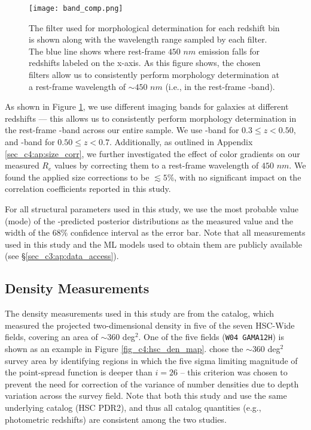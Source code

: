 \begin{figure}[htb]
    \centering
    \texttt{[image: band\_comp.png]}
    \caption{The filter used for morphological determination for each redshift bin is shown along with the wavelength range sampled by each filter. The blue line shows where rest-frame $450\,\,nm$ emission falls for redshifts labeled on the x-axis. As this figure shows, the chosen filters allow us to consistently perform morphology determination at a rest-frame wavelength of $\sim450\,\,nm$ (i.e., in the rest-frame \gb{}-band).}
    \label{fig_c4:band_comp}
\end{figure}

As shown in Figure \ref{fig_c4:band_comp}, we use different imaging bands for galaxies at different redshifts --- this allows us to consistently perform morphology determination in the rest-frame \gb-band across our entire sample. We use \rb-band for $0.3 \leq z < 0.50$, and \ib-band for $0.50 \leq z < 0.7$. Additionally, as outlined in Appendix \ref{sec_c4:ap:size_corr}, we further investigated the effect of color gradients on our measured $R_e$ values by correcting them to a rest-frame wavelength of $450\,\,nm$. We found the applied size corrections to be $\lesssim5\%$, with no significant impact on the correlation coefficients reported in this study. 

For all structural parameters used in this study, we use the most probable value (mode) of the \gampen{}-predicted posterior distributions as the measured value and the width of the $68\%$ confidence interval as the error bar. Note that all measurements used in this study and the ML models used to obtain them are publicly available (see \S \ref{sec_c3:ap:data_access}).

\subsection{Density Measurements} \label{sec_c4:density_measurements}

The density measurements used in this study are from the \citet{hsc_den} catalog, which measured the projected two-dimensional density in five of the seven HSC-Wide fields, covering an area of $\sim 360$ deg$^2$. One of the five fields (\texttt{W04 GAMA12H}) is shown as an example in Figure \ref{fig_c4:hsc_den_map}. \citet{hsc_den} chose the $\sim 360$ deg$^2$ survey area by identifying regions in which the five sigma limiting magnitude of the point-spread function is deeper than $i=26$ -- this criterion was chosen to prevent the need for correction of the variance of number densities due to depth variation across the survey field. Note that both this study and \citet{hsc_den} use the same underlying catalog (HSC PDR2), and thus all catalog quantities (e.g., photometric redshifts) are consistent among the two studies.

